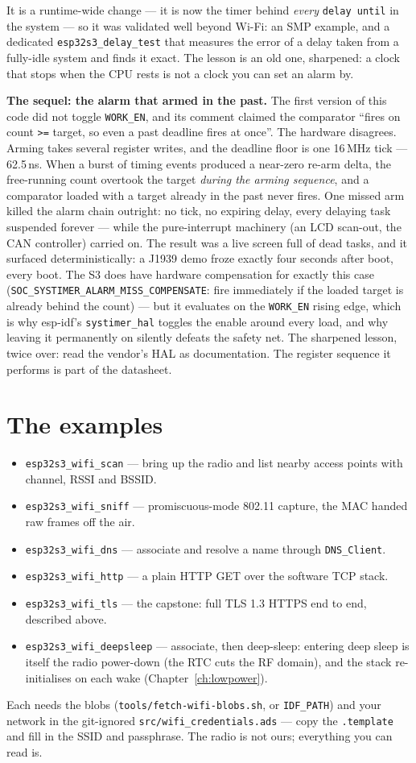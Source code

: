 It is a runtime-wide change --- it is now the timer behind \emph{every}
\texttt{delay until} in the system --- so it was validated well beyond Wi-Fi: an
SMP example, and a dedicated \texttt{esp32s3\_delay\_test} that measures the
error of a delay taken from a fully-idle system and finds it exact. The lesson is
an old one, sharpened: a clock that stops when the CPU rests is not a clock you
can set an alarm by.

\textbf{The sequel: the alarm that armed in the past.} The first version of
this code did not toggle \texttt{WORK\_EN}, and its comment claimed the
comparator ``fires on count \texttt{>=} target, so even a past deadline fires
at once''. The hardware disagrees. Arming takes several register writes, and
the deadline floor is one 16\,MHz tick --- 62.5\,ns. When a burst of timing
events produced a near-zero re-arm delta, the free-running count overtook the
target \emph{during the arming sequence}, and a comparator loaded with a
target already in the past never fires. One missed arm killed the alarm chain
outright: no tick, no expiring delay, every delaying task suspended forever ---
while the pure-interrupt machinery (an LCD scan-out, the CAN controller)
carried on. The result was a live screen full of dead tasks, and it surfaced
deterministically: a J1939 demo froze exactly four seconds after boot, every
boot. The S3 does have hardware compensation for exactly this case
(\texttt{SOC\_SYSTIMER\_ALARM\_MISS\_COMPENSATE}: fire immediately if the
loaded target is already behind the count) --- but it evaluates on the
\texttt{WORK\_EN} rising edge, which is why esp-idf's \texttt{systimer\_hal}
toggles the enable around every load, and why leaving it permanently on
silently defeats the safety net. The sharpened lesson, twice over: read the
vendor's HAL as documentation. The register sequence it performs is part of
the datasheet.

\section{The examples}
\label{ch:wifi:examples}

\begin{itemize}[nosep]
\item \texttt{esp32s3\_wifi\_scan} --- bring up the radio and list nearby access
points with channel, RSSI and BSSID.
\item \texttt{esp32s3\_wifi\_sniff} --- promiscuous-mode 802.11 capture, the MAC
handed raw frames off the air.
\item \texttt{esp32s3\_wifi\_dns} --- associate and resolve a name through
\texttt{DNS\_Client}.
\item \texttt{esp32s3\_wifi\_http} --- a plain HTTP GET over the software TCP
stack.
\item \texttt{esp32s3\_wifi\_tls} --- the capstone: full TLS 1.3 HTTPS end to end,
described above.
\item \texttt{esp32s3\_wifi\_deepsleep} --- associate, then deep-sleep: entering
deep sleep is itself the radio power-down (the RTC cuts the RF domain), and the
stack re-initialises on each wake (Chapter~\ref{ch:lowpower}).
\end{itemize}

Each needs the blobs (\texttt{tools/fetch-wifi-blobs.sh}, or \texttt{IDF\_PATH})
and your network in the git-ignored \texttt{src/wifi\_credentials.ads} --- copy
the \texttt{.template} and fill in the SSID and passphrase. The radio is not
ours; everything you can read is.
